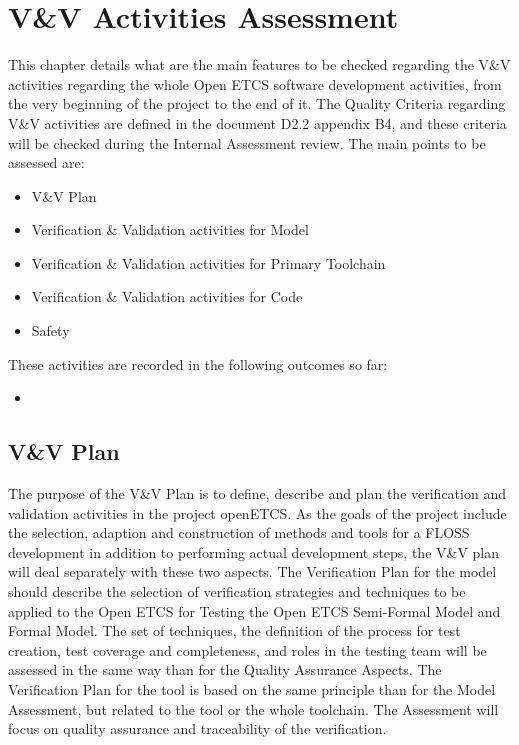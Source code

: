 \documentclass{template/openetcs_report}
\begin{document}
\section{V\&V Activities Assessment}
This chapter details what are the main features to be checked regarding the V\&V activities regarding the whole Open ETCS software development activities, from the very beginning of the project to the end of it.
The Quality Criteria regarding V\&V activities are defined in the document D2.2 appendix B4, and these criteria will be checked during the Internal Assessment review. The main points to be assessed are:
\begin{itemize}
\item V\&V Plan
\item Verification \& Validation activities for Model
\item Verification \& Validation activities for Primary Toolchain
\item Verification \& Validation activities for Code
\item Safety
\end{itemize}
These activities are recorded in the following outcomes so far:
\begin{itemize}
\item  
\end{itemize}

\subsection{V\&V Plan}
The purpose of the V\&V Plan is to define, describe and plan the verification and validation activities in the project openETCS. As the goals of the project include the selection, adaption and construction of methods and tools for a FLOSS development in addition to performing actual development steps, the V\&V plan will deal separately with these two aspects.
The Verification Plan for the model should describe the selection of verification strategies and techniques to be applied to the Open ETCS for Testing the Open ETCS Semi-Formal Model and Formal Model. The set of techniques, the definition of the process for test creation, test coverage and completeness, and roles in the testing team will be assessed in the same way than for the Quality Assurance Aspects.
The Verification Plan for the tool is based on the same principle than for the Model Assessment, but related to the tool or the whole toolchain. The Assessment will focus on quality assurance and traceability of the verification.
\end{document}

